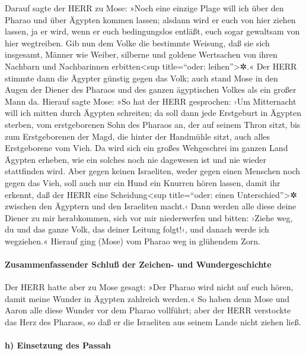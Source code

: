  Darauf sagte der HERR zu Mose: »Noch eine einzige Plage
will ich über den Pharao und über Ägypten kommen lassen; alsdann wird er
euch von hier ziehen lassen, ja er wird, wenn er euch bedingungslos
entläßt, euch sogar gewaltsam von hier wegtreiben.  Gib
nun dem Volke die bestimmte Weisung, daß sie sich insgesamt, Männer wie
Weiber, silberne und goldene Wertsachen von ihren Nachbarn und
Nachbarinnen erbitten\textless sup title=``oder: leihen''\textgreater✲.«
 Der HERR stimmte dann die Ägypter günstig gegen das Volk;
auch stand Mose in den Augen der Diener des Pharaos und des ganzen
ägyptischen Volkes als ein großer Mann da.  Hierauf sagte
Mose: »So hat der HERR gesprochen: ›Um Mitternacht will ich mitten durch
Ägypten schreiten;  da soll dann jede Erstgeburt in
Ägypten sterben, vom erstgeborenen Sohn des Pharaos an, der auf seinem
Thron sitzt, bis zum Erstgeborenen der Magd, die hinter der Handmühle
sitzt, auch alles Erstgeborene vom Vieh.  Da wird sich ein
großes Wehgeschrei im ganzen Land Ägypten erheben, wie ein solches noch
nie dagewesen ist und nie wieder stattfinden wird.  Aber
gegen keinen Israeliten, weder gegen einen Menschen noch gegen das Vieh,
soll auch nur ein Hund ein Knurren hören lassen, damit ihr erkennt, daß
der HERR eine Scheidung\textless sup title=``oder: einen
Unterschied''\textgreater✲ zwischen den Ägyptern und den Israeliten
macht.‹  Dann werden alle diese deine Diener zu mir
herabkommen, sich vor mir niederwerfen und bitten: ›Ziehe weg, du und
das ganze Volk, das deiner Leitung folgt!‹, und danach werde ich
wegziehen.« Hierauf ging (Mose) vom Pharao weg in glühendem Zorn.

\hypertarget{zusammenfassender-schluuxdf-der-zeichen--und-wundergeschichte}{%
\paragraph{Zusammenfassender Schluß der Zeichen- und
Wundergeschichte}\label{zusammenfassender-schluuxdf-der-zeichen--und-wundergeschichte}}

 Der HERR hatte aber zu Mose gesagt: »Der Pharao wird
nicht auf euch hören, damit meine Wunder in Ägypten zahlreich werden.«
 So haben denn Mose und Aaron alle diese Wunder vor dem
Pharao vollführt; aber der HERR verstockte das Herz des Pharaos, so daß
er die Israeliten aus seinem Lande nicht ziehen ließ.

\hypertarget{h-einsetzung-des-passah}{%
\paragraph{h) Einsetzung des Passah}\label{h-einsetzung-des-passah}}

